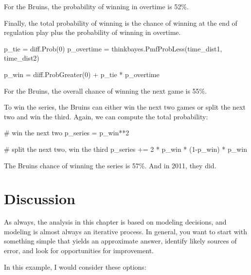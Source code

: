 \documentclass[12pt]{book}
\theoremstyle{exercise}
\begin{document}
For the Bruins, the probability of winning in overtime is 52\%.

Finally, the total probability of winning is the chance of
winning at the end of regulation play plus the probability
of winning in overtime.

\begin{code}
    p_tie = diff.Prob(0)
    p_overtime = thinkbayes.PmfProbLess(time_dist1, time_dist2)

    p_win = diff.ProbGreater(0) + p_tie * p_overtime
\end{code}  

For the Bruins, the overall chance of winning the next game is 55\%.

To win the series, the Bruins can either win the next two games
or split the next two and win the third.  Again, we can compute
the total probability:

\begin{code}
    # win the next two
    p_series = p_win**2

    # split the next two, win the third
    p_series += 2 * p_win * (1-p_win) * p_win
\end{code}  

The Bruins chance of winning the series is 57\%.  And in 2011,
they did.


\section{Discussion}

As always, the analysis in this chapter is based on modeling decisions,
and modeling is almost always an iterative process.  In general,
you want to start with something simple that yields an approximate
answer, identify likely sources of error, and look for opportunities
for improvement.

In this example, I would consider these options:
\end{document}

